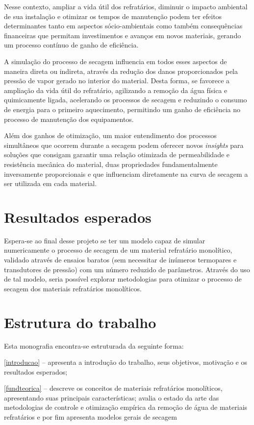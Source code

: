 Nesse contexto, ampliar a vida útil dos refratários, diminuir o impacto
ambiental de sua instalação e otimizar os tempos de manutenção podem ter efeitos
determinantes tanto em aspectos sócio-ambientais como também consequências
financeiras que permitam investimentos e avanços em novos materiais, gerando um
processo contínuo de ganho de eficiência.

A simulação do processo de secagem influencia em todos esses aspectos de maneira
direta ou indireta, através da redução dos danos proporcionados pela pressão de
vapor gerado no interior do material. Desta forma, se favorece a ampliação da
vida útil do refratário, agilizando a remoção da água física e quimicamente
ligada, acelerando os processos de secagem e reduzindo o consumo de energia para
o primeiro aquecimento, permitindo um ganho de eficiência no processo de
manutenção dos equipamentos.

Além dos ganhos de otimização, um maior entendimento dos processos simultâneos
que ocorrem durante a secagem podem oferecer novos \textit{insights} para
soluções que consigam garantir uma relação otimizada de permeabilidade e
resistência mecânica do material, duas propriedades fundamentalmente
inversamente proporcionais e que influenciam diretamente na curva de secagem a
ser utilizada em cada material.


   \section{Resultados esperados} \label{results-esperados} Espera-se ao final
   desse projeto se ter um modelo capaz de simular numericamente o processo de
   secagem de um material refratário monolítico, validado através de ensaios
   baratos (sem necessitar de inúmeros termopares e transdutores de pressão) com
   um número reduzido de parâmetros. Através do uso de tal modelo, seria
   possível explorar metodologias para otimizar o processo de secagem dos
   materiais refratários monolíticos.

    
\section{Estrutura do trabalho}
    
Esta monografia encontra-se estruturada da seguinte forma:
    
\autoref{introducao} – apresenta a introdução do trabalho, seus objetivos, motivação e os resultados esperados;
    
\autoref{fundteorica} – descreve os conceitos de materiais refratários
monolíticos, apresentando suas principais características; avalia o estado da
arte das metodologias de controle e otimização empírica da remoção de água de
materiais refratários e por fim apresenta modelos gerais de secagem
    
